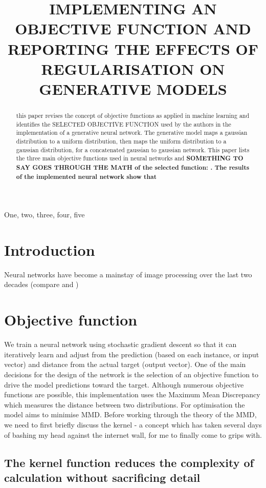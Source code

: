 \documentclass{article}
\title{IMPLEMENTING AN OBJECTIVE FUNCTION AND REPORTING THE EFFECTS OF REGULARISATION ON GENERATIVE MODELS}
\begin{document}
%
\maketitle
%
\begin{abstract}
this paper revises the concept of objective functions as applied in machine learning and identifies the SELECTED OBJECTIVE FUNCTION used by the authors in the implementation of a generative neural network.  The generative model maps a gaussian distribution to a uniform distribution, then maps the uniform distribution to a gaussian distribution, for a concatenated gaussian to gaussian network.  This paper lists the three main objective functions used in neural networks and \bf{SOMETHING TO SAY GOES THROUGH THE MATH of the selected function:  .}  The results of the implemented neural network show that 
\end{abstract}
%
\begin{keywords}
One, two, three, four, five
\end{keywords}
%
\section{Introduction}
\label{sec:intro}
%
Neural networks have become a mainstay of image processing over the last two decades (compare \cite{parisi1998car} and \cite{naranjo2020review}) 

\section{Objective function}
\label{sec:format}

We train a neural network using stochastic gradient descent so that it can iteratively learn and adjust from the prediction (based on each instance, or input vector) and distance from the actual target (output vector).  One of the main decisions for the design of the network is the selection of an objective function to drive the model predictions toward the target.  Although numerous objective functions are possible, this implementation uses the Maximum Mean Discrepancy which measures the distance between two distributions.  For optimisation the model aims to minimise MMD.  Before working through the theory of the MMD, we need to first briefly discuss the kernel - a concept which has taken several days of bashing my head against the internet wall, for me to finally come to grips with.  

\subsection{The kernel function reduces the complexity of calculation without sacrificing detail}
\label{ssec:kernel}
\end{document}
